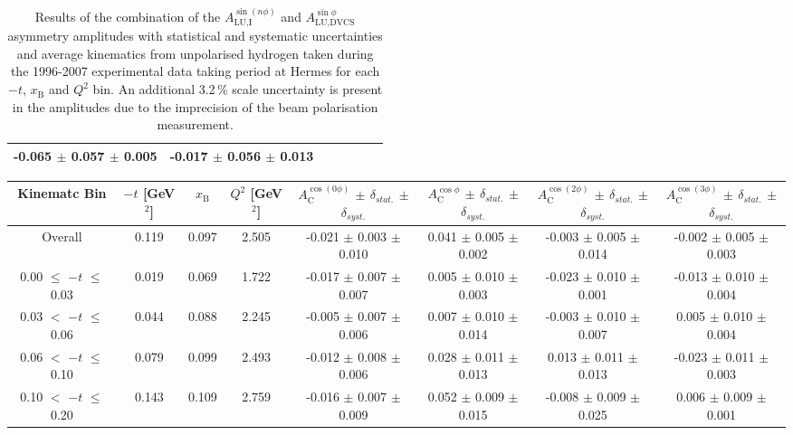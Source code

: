 \begin{table}[width=15cm]
\begin{center}
{\begin{tabular}{|c|c|c|c|c|c|c|}
-0.065  $\pm$  0.057 $\pm$ 0.005 & -0.017  $\pm$  0.056  $\pm$  0.013\\
\hline
  \end{tabular}
}
 \end{center}
\caption{Results of the combination of the $A_{\textrm{LU,I}}^{\sin(n\phi)}$ and $A_{\textrm{LU,DVCS}}^{\sin \phi}$ asymmetry amplitudes with statistical and systematic uncertainties and average kinematics from unpolarised hydrogen taken during
the 1996-2007 experimental data taking period at H{\sc ermes} for each $-t$, $x_{\textrm{B}}$ and $Q^{2}$ bin.
An additional 3.2\,\% scale uncertainty is present in the amplitudes due to the imprecision of
the beam polarisation measurement.
}
\end{table}


\begin{table}[width=15cm]
 \begin{center}
\resizebox{16cm}{!} {
  \begin{tabular}{|c|c|c|c|c|c|c|c|}
\hline
Kinematc Bin &  $-t$ [GeV$^{2}$] & $x_{\textrm{B}}$ & $Q^{2}$ [GeV$^{2}$] & 
$A_{\textrm{C}}^{\cos(0\phi)}$ $\pm$ $\delta_{stat.}$ $\pm$ $\delta_{syst.}$ & $A_{\textrm{C}}^{\cos\phi}$ $\pm$ $\delta_{stat.}$ $\pm$ $\delta_{syst.}$
& $A_{\textrm{C}}^{\cos(2\phi)}$ $\pm$ $\delta_{stat.}$ $\pm$ $\delta_{syst.}$ & $A_{\textrm{C}}^{\cos(3\phi)}$ $\pm$ $\delta_{stat.}$ $\pm$ $\delta_{syst.}$ \\
\hline
\hline
Overall &  0.119 & 0.097 &  2.505 &  -0.021 $\pm$  0.003 $\pm$  0.010 & 
0.041  $\pm$  0.005 $\pm$   0.002 &  -0.003  $\pm$  0.005  $\pm$   0.014 &  -0.002  $\pm$   0.005   $\pm$   0.003 \\
\hline
0.00 $\leqslant$ $-t$ $\leqslant$ 0.03 &  0.019 & 0.069 & 1.722  &  -0.017  $\pm$  0.007 $\pm$ 0.007 & 
0.005  $\pm$  0.010  $\pm$   0.003 &  -0.023  $\pm$  0.010 $\pm$  0.001 &  -0.013   $\pm$  0.010   $\pm$   0.004\\
0.03 $<$ $-t$ $\leqslant$ 0.06 &  0.044 & 0.088 & 2.245 & -0.005  $\pm$  0.007  $\pm$   0.006 &
0.007 $\pm$  0.010  $\pm$   0.014 &  -0.003  $\pm$  0.010  $\pm$  0.007 &  0.005   $\pm$  0.010   $\pm$   0.004\\
0.06 $<$ $-t$ $\leqslant$ 0.10 & 0.079  & 0.099 &  2.493 & -0.012  $\pm$  0.008  $\pm$  0.006 & 
0.028 $\pm$  0.011  $\pm$   0.013 & 0.013  $\pm$  0.011 $\pm$   0.013 &  -0.023   $\pm$  0.011  $\pm$    0.003\\
0.10 $<$ $-t$ $\leqslant$ 0.20 & 0.143  & 0.109 &  2.759 &  -0.016  $\pm$  0.007   $\pm$  0.009 & 
0.052 $\pm$  0.009  $\pm$   0.015 &  -0.008  $\pm$  0.009  $\pm$  0.025 & 0.006   $\pm$  0.009    $\pm$  0.001\\

\end{tabular}}
\end{center}
\end{table}
